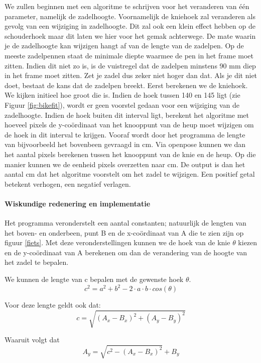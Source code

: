 \documentclass[a4paper,twoside,kulak]{kulakreport}
\begin{document}
We zullen beginnen met een algoritme te schrijven voor het veranderen van één parameter, namelijk de zadelhoogte. Voornamelijk de kniehoek zal veranderen als gevolg van een wijziging in zadelhoogte. Dit zal ook een klein effect hebben op de schouderhoek maar dit laten we hier voor het gemak achterwege. De mate waarin je de zadelhoogte kan wijzigen hangt af van de lengte van de zadelpen. Op de meeste zadelpennen staat de minimale diepte waarmee de pen in het frame moet zitten. Indien dit niet zo is, is de vuistregel dat de zadelpen minstens 90 \si{mm} diep in het frame moet zitten. Zet je zadel dus zeker niet hoger dan dat. Als je dit niet doet, bestaat de kans dat de zadelpen breekt.
Eerst berekenen we de kniehoek. We kijken initieel hoe groot die is. Indien de hoek tussen 140 \degree en 145 \degree ligt (zie Figuur \ref{fig:bikefit}), wordt er geen voorstel gedaan voor een wijziging van de zadelhoogte. Indien de hoek buiten dit interval ligt, berekent het algoritme met hoeveel pixels de y-coördinaat van het knooppunt van de heup moet wijzigen om de hoek in dit interval te krijgen. Vooraf wordt door het programma de lengte van bijvoorbeeld het bovenbeen gevraagd in \si{cm}. Via openpose kunnen we dan het aantal pixels berekenen tussen het knooppunt van de knie en de heup. Op die manier kunnen we de eenheid pixels overzetten naar \si{cm}. De output is dan het aantal \si{cm} dat het algoritme voorstelt om het zadel te wijzigen. Een positief getal betekent verhogen, een negatief verlagen.

\paragraph{Wiskundige redenering en implementatie}
Het programma veronderstelt een aantal constanten; natuurlijk de lengten van het boven- en onderbeen, punt B en de x-coördinaat van A die te zien zijn op figuur \ref{fiets}. Met deze veronderstellingen kunnen we de hoek van de knie $\theta$ kiezen en de y-coördinaat van A berekenen om dan de verandering van de hoogte van het zadel te bepalen.

We kunnen de lengte van c bepalen met de gewenste hoek $\theta$.
\[c^2 = a^2 + b^2 -2\cdot a \cdot b \cdot cos(\theta)\]

Voor deze lengte geldt ook dat:
\[c = \sqrt{(A_x - B_x)^2 + (A_y - B_y)^2}\]

Waaruit volgt dat
\[A_y = \sqrt{c^2 - (A_x - B_x)^2} + B_y\]
\end{document}
